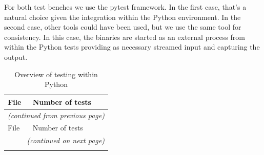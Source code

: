 For both test benches we use the pytest framework.
In the first case, that's a natural choice given the integration within the Python environment.
In the second case, other tools could have been used, but we use the same tool for consistency.
In this case, the binaries are started as an external process from within the Python tests providing as necessary streamed input and capturing the output.

\begin{longtable}{l|l}
\caption{Overview of testing within Python}\label{Tab:SourceRegressionTests} \\
File & Number of tests \\ \hline
\endfirsthead
\multicolumn{2}{l}{\textsl{(continued from previous page)}} \\
File & Number of tests \\ \hline
\endhead
\hline \multicolumn{2}{r}{\textsl{(continued on next page)}} \\
\endfoot
\hline
\endlastfoot


\end{longtable}
